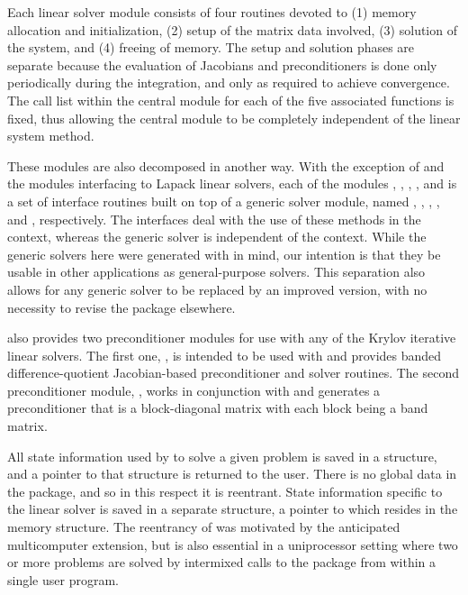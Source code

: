 Each {\cvodes} linear solver module consists of four routines devoted to (1)
memory allocation and initialization, (2) setup of the matrix data
involved, (3) solution of the system, and (4) freeing of memory.  
The setup and solution phases are separate because the evaluation of
Jacobians and preconditioners is done only periodically during the
integration, and only as required to achieve convergence. The call list within
the central {\cvodes} module for each of the five associated functions is
fixed, thus allowing the central module to be completely independent
of the linear system method.

These modules are also decomposed in another way.
With the exception of {\cvdiag} and the modules interfacing to Lapack linear solvers,
each of the modules {\cvdense}, {\cvband}, {\cvspgmr}, {\cvspbcg}, and
{\cvsptfqmr} is a set of interface routines built on top of a generic solver
module, named {\dense}, {\band}, {\spgmr}, {\spbcg}, and {\sptfqmr}, respectively.
The interfaces deal with the use of these methods in the {\cvodes} context, 
whereas the generic solver is independent of the context.
While the generic solvers here were generated with {\sundials} in mind, our
intention is that they be usable in other applications as
general-purpose solvers.  This separation also allows for any generic
solver to be replaced by an improved version, with no necessity to
revise the {\cvodes} package elsewhere.

{\cvodes} also provides two preconditioner modules for use with any of
the Krylov iterative linear solvers.  The first one, {\cvbandpre}, is
intended to be used with {\nvecs} and provides banded difference-quotient
Jacobian-based preconditioner and solver routines.  The second
preconditioner module, {\cvbbdpre}, works in conjunction with {\nvecp}
and generates a preconditioner that is a block-diagonal matrix with
each block being a band matrix.

All state information used by {\cvodes} to solve a given problem is saved
in a structure, and a pointer to that structure is returned to the
user.  There is no global data in the {\cvodes} package, and so in this
respect it is reentrant. State information specific to the linear
solver is saved in a separate structure, a pointer to which resides in
the {\cvodes} memory structure. The reentrancy of {\cvodes} was motivated
by the anticipated multicomputer extension, but is also essential
in a uniprocessor setting where two or more problems are solved by
intermixed calls to the package from within a single user program.

